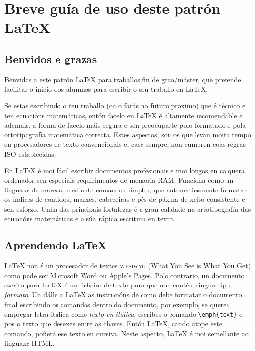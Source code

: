 
\chapter{Breve guía de uso deste patrón \LaTeX{}}

\label{Chapter2} %


\section{Benvidos e grazas}
Benvidos a este patrón \LaTeX{} para traballos fin de grao/máster, que pretende facilitar o inicio dos alumnos para escribir o seu traballo en \LaTeX{}.

Se estas escribindo o teu traballo (ou o farás no futuro próximo) que é técnico e ten ecuacións matemáticas, entón facelo en \LaTeX{} é altamente recomendable e ademais, a forma de facelo máis segura e sen preocuparte polo formatado e pola ortotipografía matemática correcta. Estes aspectos, son os que levan moito tempo en procesadores de texto convencionais e, case sempre, non cumpren coas regras ISO establecidas. 

En \LaTeX{} é moi fácil escribir documentos profesionais e moi longos en calquera ordenador sen especiais requirimentos de memoria RAM. Funciona como un linguaxe de marcas, mediante comandos simples, que automaticamente formatan os índices de contidos, marxes, cabeceiras e pés de páxina de xeito consistente e sen esforzo. Unha das principais fortalezas é a gran calidade na ortotipografía das ecuacións matemáticas e a súa rápida escritura en texto.


\section{Aprendendo \LaTeX{}}

\LaTeX{} non é un procesador de textos \textsc{wysiwyg} (What You See is What You Get) como pode ser Microsoft Word ou Apple's Pages. Polo contrario, un documento escrito para \LaTeX{} é un ficheiro de texto puro que non contén ningún tipo \emph{formato}. Un dálle a \LaTeX{} as instrucións de como debe formatar o documento final escribindo os comandos dentro do documento, por exemplo, se queres empregar letra itálica  como \emph{texto en itálica}, escribes o comando \verb|\emph{text}| e pos o texto que desexes entre as chaves. Entón \LaTeX{}, cando atope este comando, poñerá ese texto en cursiva. Neste aspecto, \LaTeX{} é moi semellante ao linguaxe HTML.

